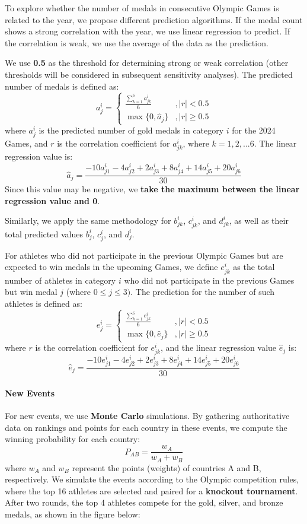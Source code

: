 \documentclass{mcmthesis}  %
\begin{document}
To explore whether the number of medals in consecutive Olympic Games is related to the year, we propose different prediction algorithms. If the medal count shows a strong correlation with the year, we use linear regression to predict. If the correlation is weak, we use the average of the data as the prediction.

We use \textbf{0.5} as the threshold for determining strong or weak correlation (other thresholds will be considered in subsequent sensitivity analyses). The predicted number of medals is defined as:
\[
a^i_j = 
\begin{cases} 
    \frac{\sum_{k=1}^{6}a^i_{jk}}{6} & , |r|  <0.5 \\
    \max\{0, \hat{a}_j\}  & , |r| \geq 0.5
\end{cases}
\]
where $a^i_j$ is the predicted number of gold medals in category $i$ for the 2024 Games, and \textbf{$r$} is the correlation coefficient for $a^i_{jk}$, where $k=1,2,...6$. The linear regression value is:
\[
\hat{a}_j = \frac{-10 a_{j1}^i - 4 a_{j2}^i + 2 a_{j3}^i + 8 a_{j4}^i + 14 a_{j5}^i + 20 a_{j6}^i}{30}
\]
Since this value may be negative, we \textbf{take the maximum between the linear regression value and 0}.

Similarly, we apply the same methodology for $b^i_{jk}$, $c^i_{jk}$, and $d^i_{jk}$, as well as their total predicted values $b^i_j$, $c^i_j$, and $d^i_j$.

For athletes who did not participate in the previous Olympic Games but are expected to win medals in the upcoming Games, we define $e^i_{jk}$ as the total number of athletes in category $i$ who did not participate in the previous Games but win medal $j$ (where $0 \leq j \leq 3)$. The prediction for the number of such athletes is defined as:
\[
e^i_j = 
\begin{cases} 
    \frac{\sum_{k=1}^{6}e^i_{jk}}{6} & , |r|  <0.5\\
    \max\{0, \hat{e}_j\}  & , |r| \geq 0.5
\end{cases}
\]
where $r$ is the correlation coefficient for $e^i_{jk}$, and the linear regression value $\hat{e}_j$ is:
\[
\hat{e}_j = \frac{-10 e_{j1}^i - 4 e_{j2}^i + 2 e_{j3}^i + 8 e_{j4}^i + 14 e_{j5}^i + 20 e_{j6}^i}{30}
\]

\paragraph{New Events}
For new events, we use \textbf{Monte Carlo} simulations. By gathering authoritative data on rankings and points for each country in these events, we compute the winning probability for each country: 
\[
P_{AB} = \frac{w_A}{w_A + w_B}
\]
where $w_A$ and $w_B$ represent the points (weights) of countries A and B, respectively. We simulate the events according to the Olympic competition rules, where the top 16 athletes are selected and paired for a \textbf{knockout tournament}. After two rounds, the top 4 athletes compete for the gold, silver, and bronze medals, as shown in the figure below:
\end{document}
